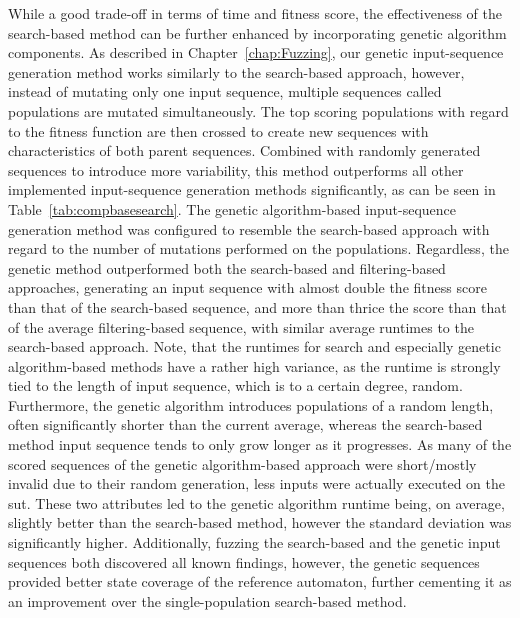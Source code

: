 While a good trade-off in terms of time and fitness score, the effectiveness of the search-based method can be further enhanced by incorporating genetic algorithm components. As described in Chapter~\ref{chap:Fuzzing}, our genetic input-sequence generation method works similarly to the search-based approach, however, instead of mutating only one input sequence, multiple sequences called populations are mutated simultaneously. The top scoring populations with regard to the fitness function are then crossed to create new sequences with characteristics of both parent sequences. Combined with randomly generated sequences to introduce more variability, this method outperforms all other implemented input-sequence generation methods significantly, as can be seen in Table~\ref{tab:compbasesearch}. The genetic algorithm-based input-sequence generation method was configured to resemble the search-based approach with regard to the number of mutations performed on the populations. Regardless, the genetic method outperformed both the search-based and filtering-based approaches, generating an input sequence with almost double the fitness score than that of the search-based sequence, and more than thrice the score than that of the average filtering-based sequence, with similar average runtimes to the search-based approach. Note, that the runtimes for search and especially genetic algorithm-based methods have a rather high variance, as the runtime is strongly tied to the length of input sequence, which is to a certain degree, random. Furthermore, the genetic algorithm introduces populations of a random length, often significantly shorter than the current average, whereas the search-based method input sequence tends to only grow longer as it progresses. As many of the scored sequences of the genetic algorithm-based approach were short/mostly invalid due to their random generation, less inputs were actually executed on the \ac{sut}. These two attributes led to the genetic algorithm runtime being, on average, slightly better than the search-based method, however the standard deviation was significantly higher. Additionally, fuzzing the search-based and the genetic input sequences both discovered all known findings, however, the genetic sequences provided better state coverage of the reference automaton, further cementing it as an improvement over the single-population search-based method.
\newpage

